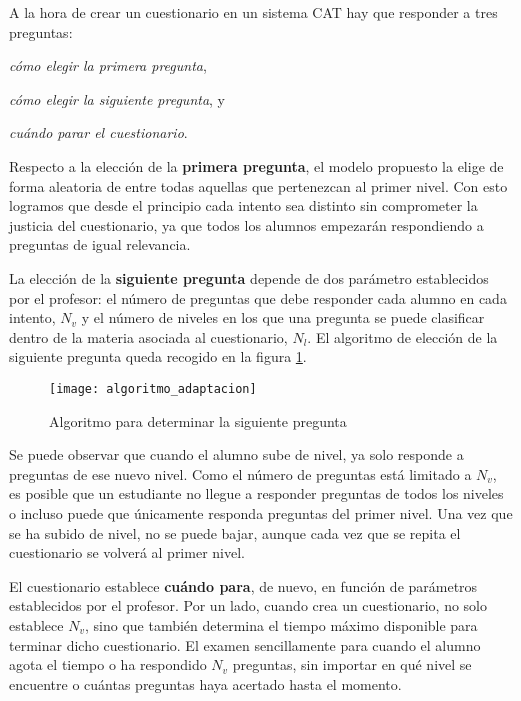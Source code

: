A la hora de crear un cuestionario en un sistema \acrshort{CAT} hay que responder a tres preguntas:
\begin{enumerate*}[label=\alph*\upshape)]
\item \textit{cómo elegir la primera pregunta},
\item \textit{cómo elegir la siguiente pregunta}, y
\item \textit{cuándo parar el cuestionario}. 
\end{enumerate*}

Respecto a la elección de la \textbf{primera pregunta}, el modelo propuesto la elige de forma aleatoria de entre todas aquellas que pertenezcan al primer nivel. Con esto logramos que desde el principio cada intento sea distinto sin comprometer la justicia del cuestionario, ya que todos los alumnos empezarán respondiendo a preguntas de igual relevancia.

La elección de la \textbf{siguiente pregunta} depende de dos parámetro establecidos por el profesor: el número de preguntas que debe responder cada alumno en cada intento, $N_v$ y el número de niveles en los que una pregunta se puede clasificar dentro de la materia asociada al cuestionario, $N_l$. El algoritmo de elección de la siguiente pregunta queda recogido en la figura \ref{fig:algoritmo de adaptacion}.

\begin{figure}[htp!]
	\centering
	\texttt{[image: algoritmo\_adaptacion]}
	\caption{Algoritmo para determinar la siguiente pregunta}
	\label{fig:algoritmo de adaptacion}
\end{figure}

Se puede observar que cuando el alumno sube de nivel, ya solo responde a preguntas de ese nuevo nivel. Como el número de preguntas está limitado a $N_v$, es posible que un estudiante no llegue a responder preguntas de todos los niveles o incluso puede que únicamente responda preguntas del primer nivel. Una vez que se ha subido de nivel, no se puede bajar, aunque cada vez que se repita el cuestionario se volverá al primer nivel.

El cuestionario establece \textbf{cuándo para}, de nuevo, en función de parámetros establecidos por el profesor. Por un lado, cuando crea un cuestionario, no solo establece $N_v$, sino que también determina el tiempo máximo disponible para terminar dicho cuestionario. El examen sencillamente para cuando el alumno agota el tiempo o ha respondido $N_v$ preguntas, sin importar en qué nivel se encuentre o cuántas preguntas haya acertado hasta el momento.

